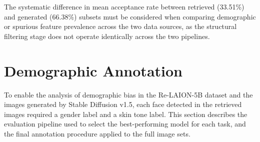 The systematic difference in mean acceptance rate between retrieved (33.51\%) and generated (66.38\%) subsets must be considered when comparing demographic or spurious feature prevalence across the two data sources, as the structural filtering stage does not operate identically across the two pipelines.


\section{}


\section{Demographic Annotation}
\label{sec:demographic_annotation}

To enable the analysis of demographic bias in the Re-LAION-5B dataset and the images generated by Stable Diffusion v1.5, each face detected in the retrieved images required a gender label and a skin tone label. This section describes the evaluation pipeline used to select the best-performing model for each task, and the final annotation procedure applied to the full image sets.

